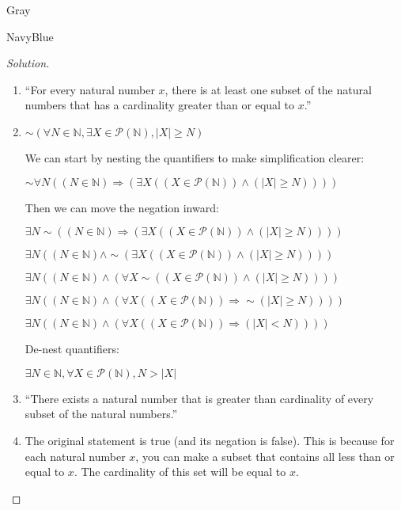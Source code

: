 \documentclass[12pt]{amsart}
\theoremstyle{named}
\newenvironment{soln}
{\begin{color}{Gray}\begin{framed}\begin{color}{NavyBlue}\begin{proof}[Solution]
\doublespacing}
{\end{proof}\end{color}\end{framed}\end{color}}
\theoremstyle{definition}
\newcommand{\N}{\mathbb N}
\begin{document}
\begin{soln}
	\phantom{ }

	\begin{enumerate}
		\item ``For every natural number $x$, there is at least one subset of the 
		natural numbers that has a cardinality greater than or equal to $x$.''
		

		\item $\sim (\forall N\in\N,\exists X\in\mathscr P(\N),|X|\geq N)$
		
		\noindent We can start by nesting the quantifiers to make simplification clearer:
		
		\noindent $\sim \forall N ((N \in \mathbb N) \Rightarrow (\exists X((X \in \mathscr P(\N)) \land (|X| \geq N))))$
		
		\noindent Then we can move the negation inward: 

		\noindent $\exists N \sim ((N \in \mathbb N) \Rightarrow (\exists X((X \in \mathscr P(\N)) \land (|X| \geq N))))$

		\noindent $\exists N ((N \in \mathbb N) \land \sim (\exists X((X \in \mathscr P(\N)) \land (|X| \geq N))))$

		\noindent $\exists N ((N \in \mathbb N) \land (\forall X \sim((X \in \mathscr P(\N)) \land (|X| \geq N))))$

		\noindent $\exists N ((N \in \mathbb N) \land (\forall X ((X \in \mathscr P(\N)) \Rightarrow \sim (|X| \geq N))))$

		\noindent $\exists N ((N \in \mathbb N) \land (\forall X ((X \in \mathscr P(\N)) \Rightarrow (|X| < N))))$

		\noindent De-nest quantifiers:

		\noindent $\exists N \in \mathbb N, \forall X \in \mathscr P (\mathbb N),N > |X|$


		\item ``There exists a natural number that is greater than cardinality of every subset
		of the natural numbers.''

		\item The original statement is true (and its negation is false). This
		is because for each natural number $x$, you can make a subset that contains
		all less than or equal to $x$. The cardinality of
		this set will be equal to $x$.

		\phantom{ }

	\end{enumerate}
\end{soln}
\end{document}
